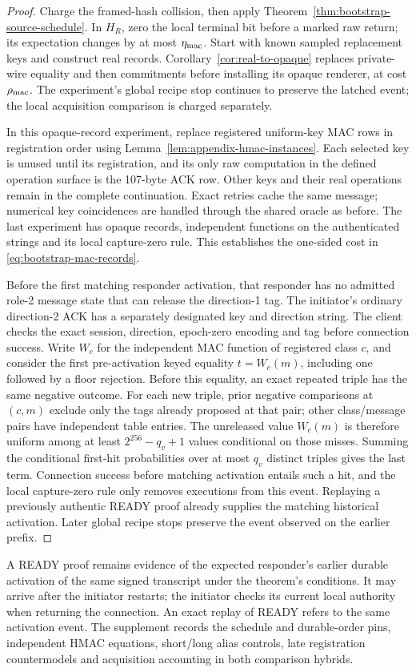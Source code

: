 \begin{proof}
Charge the framed-hash collision, then apply
Theorem~\ref{thm:bootstrap-source-schedule}. In $H_R$, zero the local
terminal bit before a marked raw return; its expectation changes by at
most $\eta_{\rm mac}$. Start with known sampled replacement keys and
construct real records. Corollary~\ref{cor:real-to-opaque} replaces
private-wire equality and then commitments before installing its opaque
renderer, at cost $\rho_{\rm mac}$. The experiment's global recipe
stop continues to preserve the latched event; the local acquisition
comparison is charged separately.

In this opaque-record experiment, replace registered uniform-key MAC rows
in registration order using Lemma~\ref{lem:appendix-hmac-instances}.
Each selected key is unused until its registration, and its only raw
computation in the defined operation surface is the 107-byte ACK row.
Other keys and their real operations remain in the complete continuation.
Exact retries cache the same message; numerical key coincidences are
handled through the shared oracle as before. The last experiment has opaque
records, independent functions on the authenticated strings and its local
capture-zero rule. This establishes the one-sided cost in
\eqref{eq:bootstrap-mac-records}.

Before the first matching responder activation, that responder has no
admitted role-2 message state that can release the direction-1 tag.
The initiator's ordinary direction-2 ACK has a separately designated key and
direction string. The client checks the exact session, direction, epoch-zero
encoding and tag before connection success. Write $W_c$ for the independent
MAC function of registered class $c$, and consider the first pre-activation
keyed equality $t=W_c(m)$, including one followed by a floor rejection.
Before this equality, an exact repeated triple has the same negative
outcome. For each new triple, prior negative comparisons at $(c,m)$ exclude
only the tags already proposed at that pair; other class/message pairs
have independent table entries. The unreleased value $W_c(m)$ is therefore
uniform among at least $2^{256}-q_v+1$ values conditional on those misses.
Summing the conditional first-hit probabilities over at most $q_v$
distinct triples gives the last term. Connection success before matching
activation entails such a hit, and the local capture-zero rule only removes
executions from this event. Replaying a previously authentic READY proof
already supplies the matching historical activation. Later global recipe
stops preserve the event observed on the earlier prefix.
\end{proof}

A READY proof remains evidence of the expected responder's earlier
durable activation of the same signed transcript under the theorem's
conditions. It may arrive after the initiator restarts; the initiator
checks its current local authority when returning the connection.
An exact replay of READY refers to the same activation event. The supplement
records the schedule and durable-order pins, independent HMAC equations,
short/long alias controls, late registration countermodels and
acquisition accounting in both comparison hybrids.
